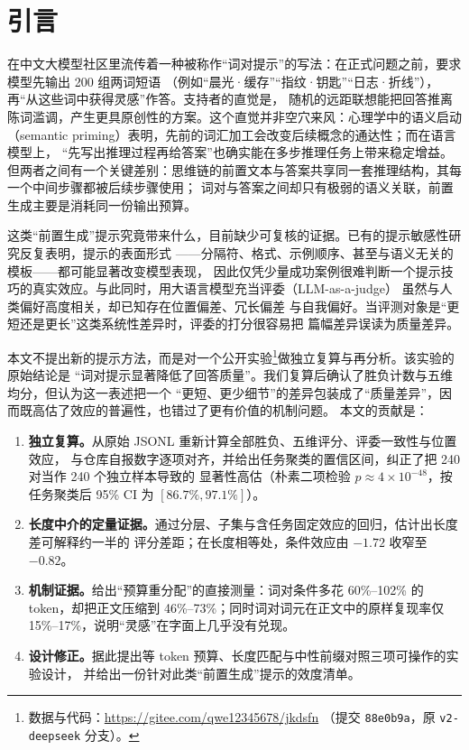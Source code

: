 \documentclass[UTF8,11pt,a4paper]{ctexart}
\begin{document}
\vspace{0.4em}

\section{引言}

在中文大模型社区里流传着一种被称作“词对提示”的写法：在正式问题之前，要求模型先输出 200 组两词短语
（例如“晨光·缓存”“指纹·钥匙”“日志·折线”），再“从这些词中获得灵感”作答。支持者的直觉是，
随机的远距联想能把回答推离陈词滥调，产生更具原创性的方案。这个直觉并非空穴来风：心理学中的语义启动
（semantic priming）表明，先前的词汇加工会改变后续概念的通达性\cite{meyer1971}；而在语言模型上，
“先写出推理过程再给答案”也确实能在多步推理任务上带来稳定增益\cite{wei2022cot,kojima2022,Wang2023selfconsistency}。
但两者之间有一个关键差别：思维链的前置文本与答案共享同一套推理结构，其每一个中间步骤都被后续步骤使用；
词对与答案之间却只有极弱的语义关联，前置生成主要是消耗同一份输出预算。

这类“前置生成”提示究竟带来什么，目前缺少可复核的证据。已有的提示敏感性研究反复表明，提示的表面形式
——分隔符、格式、示例顺序、甚至与语义无关的模板——都可能显著改变模型表现\cite{sclar2024,webson2022,mizrahi2024}，
因此仅凭少量成功案例很难判断一个提示技巧的真实效应。与此同时，用大语言模型充当评委（LLM-as-a-judge）
虽然与人类偏好高度相关\cite{zheng2023}，却已知存在位置偏差\cite{wang2024fair}、冗长偏差\cite{saito2023,dubois2024lc}
与自我偏好\cite{panickssery2024}。当评测对象是“更短还是更长”这类系统性差异时，评委的打分很容易把
篇幅差异误读为质量差异。

本文不提出新的提示方法，而是对一个公开实验\footnote{数据与代码：\url{https://gitee.com/qwe12345678/jkdsfn}
（提交 \texttt{88e0b9a}，原 \texttt{v2-deepseek} 分支）。}做独立复算与再分析。该实验的原始结论是
“词对提示显著降低了回答质量”。我们复算后确认了胜负计数与五维均分，但认为这一表述把一个
“更短、更少细节”的差异包装成了“质量差异”，因而既高估了效应的普遍性，也错过了更有价值的机制问题。
本文的贡献是：

\begin{enumerate}[label=(\arabic*)]
\item \textbf{独立复算。}从原始 JSONL 重新计算全部胜负、五维评分、评委一致性与位置效应，
      与仓库自报数字逐项对齐，并给出任务聚类的置信区间，纠正了把 240 对当作 240 个独立样本导致的
      显著性高估（朴素二项检验 $p\approx4\times10^{-48}$，按任务聚类后 95\% CI 为 $[86.7\%, 97.1\%]$）。
\item \textbf{长度中介的定量证据。}通过分层、子集与含任务固定效应的回归，估计出长度差可解释约一半的
      评分差距；在长度相等处，条件效应由 $-1.72$ 收窄至 $-0.82$。
\item \textbf{机制证据。}给出“预算重分配”的直接测量：词对条件多花 60\%--102\% 的 token，却把正文压缩到
      46\%--73\%；同时词对词元在正文中的原样复现率仅 15\%--17\%，说明“灵感”在字面上几乎没有兑现。
\item \textbf{设计修正。}据此提出等 token 预算、长度匹配与中性前缀对照三项可操作的实验设计，
      并给出一份针对此类“前置生成”提示的效度清单。
\end{enumerate}
\end{document}
